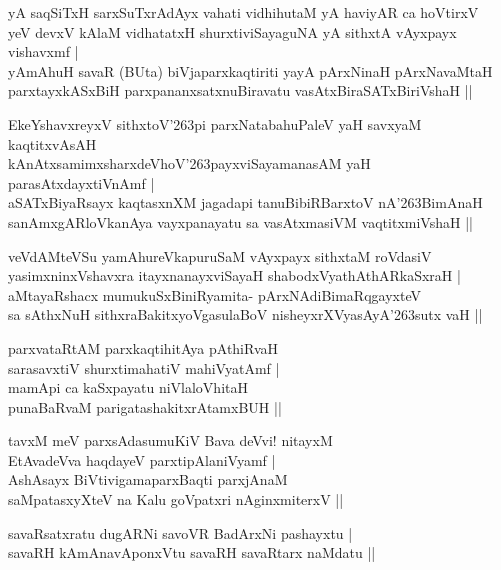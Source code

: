 \begin{itemize}
{\bf
\item[(1)] yA saqSiTxH sarxSuTxrAdAyx vahati vidhihutaM yA haviyAR ca hoVtirxV \\\label{243}
yeV devxV kAlaM vidhatatxH shurxtiviSayaguNA yA sithxtA vAyxpayx vishavxmf |\\
yAmAhuH savaR (BUta) biVjaparxkaqtiriti yayA pArxNinaH pArxNavaMtaH \\
parxtayxkASxBiH parxpananxsatxnuBiravatu vasAtxBiraSATxBiriVshaH ||
\item[(2)] EkeYshavxreyxV sithxtoV\char'263pi parxNatabahuPaleV yaH savxyaM kaqtitxvAsAH \\\label{243}
kAnAtxsamimxsharxdeVhoV\char'263payxviSayamanasAM yaH parasAtxdayxtiVnAmf |\\
aSATxBiyaRsayx kaqtasxnXM jagadapi tanuBibiRBarxtoV nA\char'263BimAnaH\\
sanAmxgARloVkanAya vayxpanayatu sa vasAtxmasiVM vaqtitxmiVshaH ||
\item[(3)] veVdAMteVSu yamAhureVkapuruSaM vAyxpayx sithxtaM roVdasiV\\\label{243}
yasimxninxVshavxra itayxnanayxviSayaH shabodxVyathAthARkaSxraH |\\
aMtayaRshacx mumukuSxBiniRyamita- pArxNAdiBimaRqgayxteV \\
sa sAthxNuH sithxraBakitxyoVgasulaBoV nisheyxrXVyasAyA\char'263sutx vaH ||}

\begin{itemize}
{\bf
\item[(1)] parxvataRtAM parxkaqtihitAya pAthiRvaH\\\label{243}
sarasavxtiV shurxtimahatiV mahiVyatAmf |\\
mamApi ca kaSxpayatu niVlaloVhitaH \\
punaBaRvaM parigatashakitxrAtamxBUH ||
\item[(2)] tavxM meV parxsAdasumuKiV Bava deVvi! nitayxM\\\label{244}
EtAvadeVva haqdayeV parxtipAlaniVyamf |\\
AshAsayx BiVtivigamaparxBaqti parxjAnaM \\
saMpatasxyXteV na Kalu goVpatxri nAginxmiterxV ||
\item[(3)] savaRsatxratu dugARNi savoVR BadArxNi pashayxtu |\\\label{244}
savaRH kAmAnavAponxVtu savaRH savaRtarx naMdatu ||}
\end{itemize}
\end{itemize}

